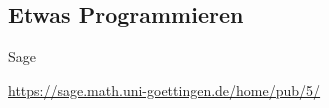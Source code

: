 \documentclass[hyperref={xetex}]{beamer}
\begin{document}
\subsection{Etwas Programmieren}
\begin{frame}[fragile]{Sage}
\begin{center}
\url{https://sage.math.uni-goettingen.de/home/pub/5/}
\end{center}
\end{frame}
%
%
\end{document}
